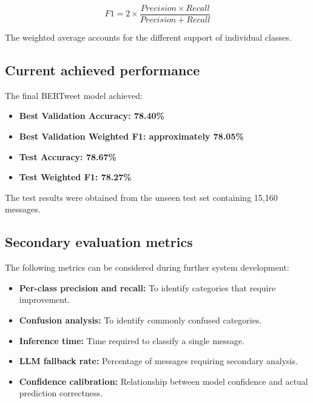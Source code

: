 \documentclass[11pt,a4paper]{article}
\begin{document}
\begin{equation}
F1 = 2 \times
\frac{Precision \times Recall}
{Precision + Recall}
\end{equation}

The weighted average accounts for the different support of individual
classes.

\subsection{Current achieved performance}

The final BERTweet model achieved:

\begin{itemize}[leftmargin=0.7cm]

    \item \textbf{Best Validation Accuracy: 78.40\%}
    \item \textbf{Best Validation Weighted F1: approximately 78.05\%}
    \item \textbf{Test Accuracy: 78.67\%}
    \item \textbf{Test Weighted F1: 78.27\%}

\end{itemize}

The test results were obtained from the unseen test set containing 15,160
messages.

\subsection{Secondary evaluation metrics}

The following metrics can be considered during further system development:

\begin{itemize}[leftmargin=0.7cm]

    \item \textbf{Per-class precision and recall:} To identify categories
    that require improvement.

    \item \textbf{Confusion analysis:} To identify commonly confused
    categories.

    \item \textbf{Inference time:} Time required to classify a single
    message.

    \item \textbf{LLM fallback rate:} Percentage of messages requiring
    secondary analysis.

    \item \textbf{Confidence calibration:} Relationship between model
    confidence and actual prediction correctness.

\end{itemize}
\end{document}
